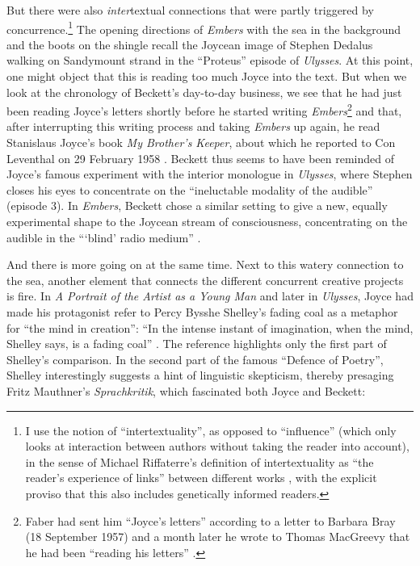 \begin{paper}
But there were also \emph{inter}textual connections that were partly
triggered by concurrence.\footnote{I use the notion of
  ``intertextuality'', as opposed to ``influence'' (which only looks at
  interaction between authors without taking the reader into account),
  in the sense of Michael Riffaterre's definition of intertextuality as
  ``the reader's experience of links'' between different works \citep[4]{riffaterre_trace_1980}, with the explicit proviso that this also includes genetically
  informed readers.} The opening directions of \emph{Embers} with the
sea in the background and the boots on the shingle recall the Joycean
image of Stephen Dedalus walking on Sandymount strand in the ``Proteus''
episode of \emph{Ulysses}. At this point, one might object that this is
reading too much Joyce into the text. But when we look at the chronology
of Beckett's day-to-day business, we see that he had just been reading
Joyce's letters shortly before he started writing
\emph{Embers}\footnote{Faber had sent him ``Joyce's letters'' according
  to a letter to Barbara Bray (18 September 1957) and a month later he
  wrote to Thomas MacGreevy that he had been ``reading his letters''
  \citep[137]{pilling_samuel_2016}.} and that, after interrupting this writing
process and taking \emph{Embers} up again, he read Stanislaus Joyce's
book \emph{My Brother's Keeper}, about which he reported to Con
Leventhal on 29 February 1958 \citep[39]{van_hulle_samuel_2013}. Beckett
thus seems to have been reminded of Joyce's famous experiment with the
interior monologue in \emph{Ulysses}, where Stephen closes his eyes to
concentrate on the ``ineluctable modality of the audible'' (episode 3).
In \emph{Embers}, Beckett chose a similar setting to give a new, equally
experimental shape to the Joycean stream of consciousness, concentrating
on the audible in the ```blind' radio medium'' \citep[251]{beloborodova_broadcasting_2018}.

And there is more going on at the same time. Next to this watery
connection to the sea, another element that connects the different
concurrent creative projects is fire. In \emph{A Portrait of the Artist
as a Young Man} and later in \emph{Ulysses}, Joyce had made his
protagonist refer to Percy Bysshe Shelley's fading coal as a metaphor
for ``the mind in creation'': ``In the intense instant of imagination,
when the mind, Shelley says, is a fading coal'' \citep[9.380]{joyce_ulysses_1986}. The
reference highlights only the first part of Shelley's comparison. In the
second part of the famous ``Defence of Poetry'', Shelley interestingly
suggests a hint of linguistic skepticism, thereby presaging Fritz
Mauthner's \emph{Sprachkritik}, which fascinated both Joyce and Beckett:


\end{paper}
